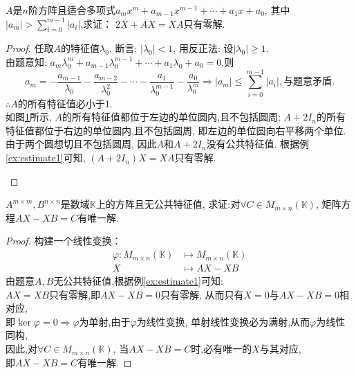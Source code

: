 \begin{application}
  $A$是$n$阶方阵且适合多项式$a_mx^m+a_{m-1}x^{m-1}+\cdots+a_1x+a_0$,
  其中$|a_m| > \sum\limits^{m-1}_{i=0}|a_i|$,求证：
  $2X+AX=XA$只有零解.
\end{application}
\begin{proof}
  任取$A$的特征值$\lambda_0$, 断言: $|\lambda_0|<1$,
  用反正法: 设$|\lambda_0|\geq 1$.\\
  由题意知: 
  $a_m\lambda_0^m+a_{m-1}\lambda_0^{m-1}+\cdots+a_1\lambda_0+a_0=0$,则
  \begin{equation*}
  a_m=-\frac{a_{m-1}}{\lambda_0}-\frac{a_{m-2}}{\lambda_0^2}-\cdots-
  \frac{a_1}{\lambda_0^{m-1}}-\frac{a_0}{\lambda_0^m} \Longrightarrow
  |a_m| \leq \sum\limits^{m-1}_{i=0}|a_i|, \text{与题意矛盾}.
\end{equation*}
$\therefore A$的所有特征值必小于1.\\
如图\ref{fg:estimate1}所示,
$A$的所有特征值都位于左边的单位圆内,且不包括圆周;
$A+2I_n$的所有特征值都位于右边的单位圆内,且不包括圆周,
即左边的单位圆向右平移两个单位.
由于两个圆想切且不包括圆周,
因此$A$和$A+2I_n$没有公共特征值.
根据例\ref{ex:estimate1}可知,
$(A+2I_n)X=XA$只有零解.
\begin{figure}[!hb]
  \caption{}\label{fg:estimate1}
\end{figure}
\end{proof}
\begin{application}\label{ap:estimate1}
  $A^{m\times m},B^{n\times n}$是数域$\mathbb{K}$上的方阵且无公共特征值,
  求证:对$\forall C \in M_{m\times n}(\mathbb{K})$,
  矩阵方程$AX-XB=C$有唯一解.
\end{application}
\begin{proof}
  构建一个线性变换：
  \begin{align*}
    \varphi:M_{m\times n}(\mathbb{K}) & \mapsto M_{m\times n}(\mathbb{K})\\
     X & \mapsto AX-XB
  \end{align*}
  由题意$A,B$无公共特征值,根据例\ref{ex:estimate1}可知:\\
  $AX=XB$只有零解,即$AX-XB=0$只有零解,
  从而只有$X=0$与$AX-XB=0$相对应,\\
  即$\ker\varphi=0 \Longrightarrow \varphi$为单射,由于$\varphi$为线性变换,
  单射线性变换必为满射,从而$\varphi$为线性同构,\\
  因此,对$\forall C \in M_{m\times n}(\mathbb{K})$,
  当$AX-XB=C$时,必有唯一的$X$与其对应,\\
  即$AX-XB=C$有唯一解.
\end{proof}
